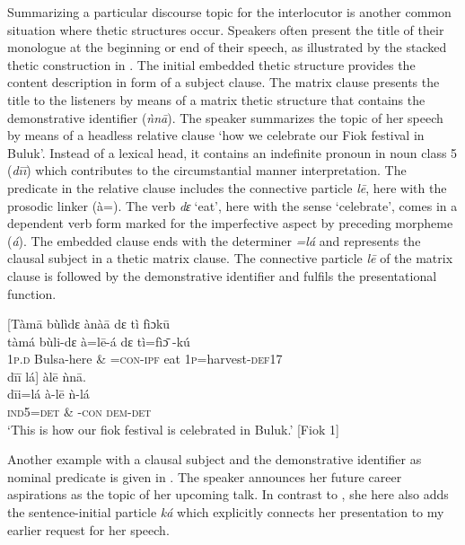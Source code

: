 \documentclass[output=paper]{langsci/langscibook}
\begin{document}
Summarizing a particular discourse topic for the interlocutor is another common situation where thetic structures occur. Speakers often present the title of their monologue at the beginning or end of their speech, as illustrated by the stacked thetic construction in . The initial embedded thetic structure provides the content description in form of a subject clause. The matrix clause presents the title to the listeners by means of a matrix thetic structure that contains the demonstrative identifier (\textit{ǹn\={a}}). The speaker summarizes the topic of her speech by means of a headless relative clause ‘how we celebrate our Fiok festival in Buluk’. Instead of a lexical head, it contains an indefinite pronoun in noun class 5 (\textit{d\={i}\={i}}) which contributes to the circumstantial manner interpretation. The predicate in the relative clause includes the connective particle \textit{l\={e}}, here with the prosodic linker (à=). The verb \textit{dɛ}‘eat’, here with the sense ‘celebrate’, comes in a dependent verb form marked for the imperfective aspect by preceding morpheme (\textit{á}). The embedded clause ends with the determiner \textit{=lá} and represents the clausal subject in a thetic matrix clause. The connective particle \textit{l\={e}} of the matrix clause is followed by the demonstrative identifier and fulfils the presentational function.

\ea
\glll \textup{}  \textup{[}Tàm\={a}  bùlìdɛ    ànà\={a}    dɛ  tì   fìɔk\={u}\\
  \textup{   tàmá  bùli-dɛ    à=l\={e}-á    dɛ  tì=fìɔ}\textup{\={} }\textup{-kú}\\
       1\textsc{p}.\textsc{d}  Bulsa-here      \& =\textsc{con}-\textsc{ipf}    eat  1\textsc{p}=harvest-\textsc{def}17  \\
\glll   d\={i}\={i}  lá\textup{] } àl\={e}    ǹn\={a}.\\
  \textup{  d\={i}i=lá    à-l\={e}    ǹ-lá}\\
     \textsc{  ind5=det     \& -con    dem-det}\\
\glt ‘This is how our fiok festival is celebrated in Buluk.’ [Fiok 1]
\z

Another example with a clausal subject and the demonstrative identifier as nominal predicate is given in . The speaker announces her future career aspirations as the topic of her upcoming talk. In contrast to , she here also adds the sentence-initial particle \textit{ká} which explicitly connects her presentation to my earlier request for her speech.
\end{document}
